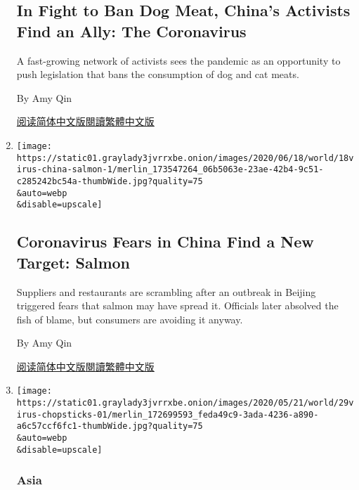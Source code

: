 \begin{enumerate}
{  \subsection{In Fight to Ban Dog Meat, China's Activists Find an Ally:
  The
  Coronavirus}\label{in-fight-to-ban-dog-meat-chinas-activists-find-an-ally-the-coronavirus}}

  A fast-growing network of activists sees the pandemic as an
  opportunity to push legislation that bans the consumption of dog and
  cat meats.

  By Amy Qin

  \href{https://cn.nytimes3xbfgragh.onion/china/20200624/china-dog-meat/}{阅读简体中文版}\href{https://cn.nytimes3xbfgragh.onion/china/20200624/china-dog-meat/zh-hant/}{閱讀繁體中文版}
\item
  \href{/2020/06/18/world/asia/coronavirus-china-salmon.html}{}

  \texttt{[image: https://static01.graylady3jvrrxbe.onion/images/2020/06/18/world/18virus-china-salmon-1/merlin\_173547264\_06b5063e-23ae-42b4-9c51-c285242bc54a-thumbWide.jpg?quality=75\\\&auto=webp\\\&disable=upscale]}

  \hypertarget{coronavirus-fears-in-china-find-a-new-target-salmon}{%
  \subsection{Coronavirus Fears in China Find a New Target:
  Salmon}\label{coronavirus-fears-in-china-find-a-new-target-salmon}}

  Suppliers and restaurants are scrambling after an outbreak in Beijing
  triggered fears that salmon may have spread it. Officials later
  absolved the fish of blame, but consumers are avoiding it anyway.

  By Amy Qin

  \href{https://cn.nytimes3xbfgragh.onion/china/20200619/coronavirus-china-salmon/}{阅读简体中文版}\href{https://cn.nytimes3xbfgragh.onion/china/20200619/coronavirus-china-salmon/zh-hant/}{閱讀繁體中文版}
\item
  \href{/es/2020/06/01/espanol/mundo/coronavirus-compartir-comida.html}{}

  \texttt{[image: https://static01.graylady3jvrrxbe.onion/images/2020/05/21/world/29virus-chopsticks-01/merlin\_172699593\_feda49c9-3ada-4236-a890-a6c57ccf6fc1-thumbWide.jpg?quality=75\\\&auto=webp\\\&disable=upscale]}

  \hypertarget{asia}{%
  \subsubsection{Asia}\label{asia}}


\end{enumerate}
